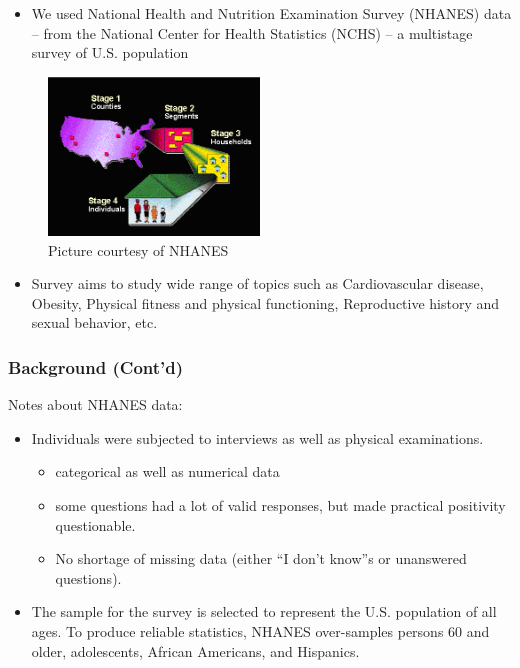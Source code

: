 \documentclass{beamer}
\begin{document}
\begin{frame}
 \begin{itemize}
  \item We used National Health and Nutrition Examination Survey (NHANES) data -- from the National Center for Health Statistics (NCHS) -- a multistage survey of U.S. population
 \end{itemize}
 \begin{figure}
 \centering
  \includegraphics[width=0.5\textwidth]{Survey_Design.PNG}
  \caption{Picture courtesy of NHANES}
 \end{figure}
 \begin{itemize}
  \item Survey aims to study wide range of topics such as Cardiovascular disease, Obesity, Physical fitness and physical functioning, Reproductive history and sexual behavior, etc.
 \end{itemize}
\end{frame}

\begin{frame}
  \frametitle{Background (Cont'd)}
  Notes about NHANES data:
  \begin{itemize}
 \item Individuals were subjected to interviews as well as physical examinations.
  \begin{itemize}
    \item categorical as well as numerical data
    \item some questions had a lot of valid responses, but made practical positivity questionable.
    \item No shortage of missing data (either ``I don't know''s or unanswered questions).
  \end{itemize}
 \item The sample for the survey is selected to represent the U.S. population of all ages. To produce reliable statistics, NHANES over-samples persons 60 and older, adolescents, African Americans, and Hispanics.
 \end{itemize}
\end{frame}
\end{document}
